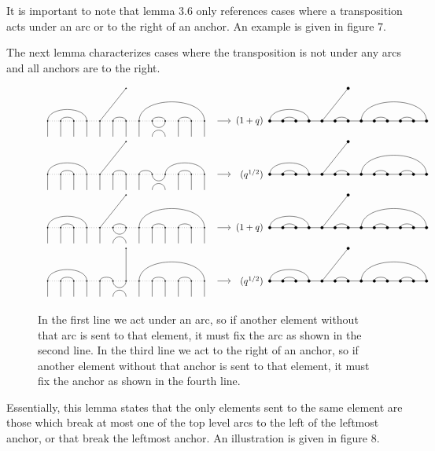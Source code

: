 \documentclass{amsart}
\begin{document}
\vspace{5mm}
It is important to note that lemma 3.6 only references cases where a transposition acts under an arc or to the right of an anchor. An example is given in figure 7. 

The next lemma characterizes cases where the transposition is not under any arcs and all anchors are to the right.

\begin{figure}[b]
	\[
	\begin{tabular}{l l l l}
	\GeneralizedAction{13}{1/4,2/3,6/7,8/13,9/10,11/12}{1}{5/1}{5/4}{9}{1/4,2/3,6/7,8/13,9/10,11/12}{5/1}{(1+q)}\\
	
	\GeneralizedAction{13}{1/4,2/3,6/7,8/9,10/13,11/12}{1}{5/1}{5/4}{9}{1/4,2/3,6/7,8/13,9/10,11/12}{5/1}{(q^{1/2})}\\
	
	\GeneralizedAction{13}{1/4,2/3,6/7,8/13,9/10,11/12}{1}{5/1}{5/4}{6}{1/4,2/3,6/7,8/13,9/10,11/12}{5/1}{(1+q)}\\
	
	\GeneralizedAction{13}{1/4,2/3,5/6,8/13,9/10,11/12}{1}{7/1}{5/4}{6}{1/4,2/3,6/7,8/13,9/10,11/12}{5/1}{(q^{1/2})}\\
	
	\end{tabular}
	\]
	
	\caption{In the first line we act under an arc, so if another element without that arc is sent to that element, it must fix the arc as shown in the second line. In the third line we act to the right of an anchor, so if another element without that anchor is sent to that element, it must fix the anchor as shown in the fourth line. 
	}
\end{figure}

Essentially, this lemma states that the only elements sent to the same element are those which break at most one of the top level arcs to the left of the leftmost anchor, or that break the leftmost anchor. An illustration is given in figure 8.
\end{document}

